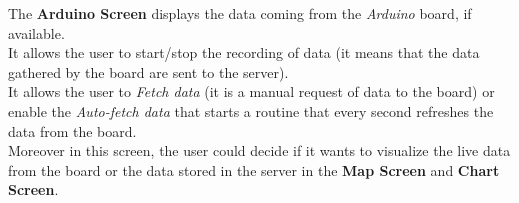 \begin{center}
The \textbf{Arduino Screen} displays the data coming from the \textit{Arduino} board, if available.\\
It allows the user to start/stop the recording of data (it means that the data gathered by the board are sent to the server).\\
It allows the user to \textit{Fetch data} (it is a manual request of data to the board) or enable the \textit{Auto-fetch data} that starts a routine that every second refreshes the data from the board.\\
Moreover in this screen, the user could decide if it wants to visualize the live data from the board or the data stored in the server in the \textbf{Map Screen} and \textbf{Chart Screen}.
\end{center}

